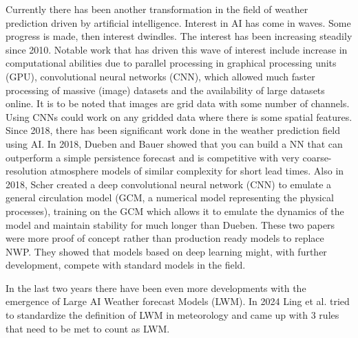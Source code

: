 Currently there has been another transformation in the field of weather prediction driven by artificial intelligence. Interest in AI has come in waves. Some progress is made, then interest dwindles. The interest has been increasing steadily since 2010. Notable work that has driven this wave of interest include increase in computational abilities due to parallel processing in graphical processing units (GPU), convolutional neural networks (CNN), which allowed much faster processing of massive (image) datasets and the availability of large datasets online. It is to be noted that images are grid data with some number of channels. Using CNNs could work on any gridded data where there is some spatial features\cite{canNNBeatNWP}. Since 2018, there has been significant work done in the weather prediction field using AI. In 2018, Dueben and Bauer showed that you can build a NN that can outperform a simple persistence forecast and is competitive with very coarse-resolution atmosphere models of similar complexity for short lead times\cite{dueben2018}. Also in 2018, Scher created a deep convolutional neural network (CNN) to emulate a general circulation model (GCM, a numerical model representing the physical processes), training on the GCM which allows it to emulate the dynamics of the model and maintain stability for much longer than Dueben\cite{scher2018}. These two papers were more proof of concept rather than production ready models to replace NWP. They showed that models based on deep learning might, with further development, compete with standard models in the field.

In the last two years there have been even more developments with the emergence of Large AI Weather forecast Models (LWM). In 2024 Ling et al. tried to standardize the definition of LWM in meteorology and came up with 3 rules that need to be met to count as LWM.

